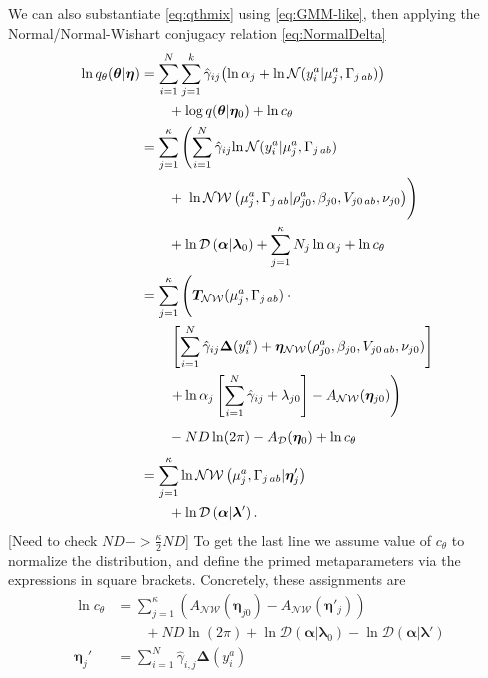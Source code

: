 \documentclass[aps,showpacs,twocolumn,prd,superscriptaddress,nofootinbib]{revtex4}
\newcommand{\nn}{\nonumber}
\begin{document}
We can also substantiate \eqref{eq:qthmix} using \eqref{eq:GMM-like}, then applying the Normal/Normal-Wishart conjugacy relation \eqref{eq:NormalDelta}
\begin{align}
  \ln q_\theta(\bm\theta|\bm\eta)
  &=\sum_{i=1}^N\sum_{j=1}^k\hat\gamma_{ij}
       {\left(\ln\alpha_j+\ln\mathcal{N}(y_i^a|\mu_j^a,\Gamma_{j\,ab})\right)}\nn\\
       &\qquad+\log q(\bm\theta|\bm\eta_0)+\ln c_\theta\nn\\
  &=\sum_{j=1}^\kappa\left(\sum_{i=1}^N\hat\gamma_{ij}
       {\ln\mathcal{N}(y_i^a|\mu_j^a,\Gamma_{j\,ab})}\right.\nn\\
       &\qquad+\left.\vphantom{\sum_{i=1}^N}
       \ln\mathcal{NW}\left(\mu_j^a,\Gamma_{j\,ab}|\rho_{j0}^a,\beta_{j0},V_{j0\,ab},\nu_{j0}\right)\right)\nn\\
       &\qquad+\ln\mathcal{D}\left(\bm\alpha|\bm\lambda_0\right)
       +\sum_{j=1}^\kappa N_j\ln\alpha_j
       +\ln c_\theta
       \nn\\
  &=\sum_{j=1}^\kappa\left(
       \vphantom{\sum_{i=1}^N} 
       \bm T_{\mathcal{NW}}(\mu_j^a,\Gamma_{j\,ab})\cdot
       \vphantom{\frac12}\right.
       \nn\\&\qquad
       \left.
       \left[\sum_{i=1}^N\hat\gamma_{ij}\bm\Delta(y_i^a)
       +\bm\eta_{\mathcal{NW}}(\rho_{j0}^a,\beta_{j0},V_{j0\,ab},\nu_{j0})\right]
       \vphantom{\sum_{i=1}^N}\right.       
       \nn\\&\qquad
       \left.
       +\ln\alpha_j\left[\sum_{i=1}^N\hat\gamma_{ij} +\lambda_{j0}\right]
       -A_{\mathcal{NW}}(\bm\eta_{j0})
       \vphantom{\sum_{i=1}^N}\right)
       \nn\\&\qquad
       \vphantom{\frac12}
       -ND\ln(2\pi)
       -A_{\mathcal{D}}(\bm\eta_0)+\ln c_\theta
       \nn\\
  &=\sum_{j=1}^\kappa\ln\mathcal{NW}\left(\mu_j^a,\Gamma_{j\,ab}|\bm\eta'_{j}\right)\nn\\
       &\qquad+\ln\mathcal{D}\left(\bm\alpha|\bm\lambda'\right).
\end{align}
[Need to check $ND->\frac\kappa2ND$]
To get the last line we assume value of $c_\theta$ to normalize the distribution, and define the primed metaparameters via the expressions in square brackets.  Concretely, these assignments are
\begin{align}
  \ln c_\theta&=\sum_{j=1}^\kappa\left( A_{\mathcal{NW}}(\bm\eta_{j0})-A_{\mathcal{NW}}(\bm\eta'_{j})\right)
  \nn\\&\qquad
  +ND\ln(2\pi)+\ln\mathcal{D}\left(\bm\alpha|\bm\lambda_0\right)-\ln\mathcal{D}\left(\bm\alpha|\bm\lambda'\right)\label{eq:Cth}\\
  \bm\eta_j'&=\sum_{i=1}^N\hat\gamma_{i,j}\bm\Delta(y_i^a)\nn
\end{align}
\end{document}
